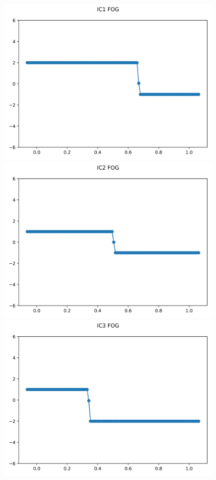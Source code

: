 \documentclass{article}
\begin{document}
\begin{figure}[t]
        \centering
        \includegraphics[width=.95\textwidth]{../../code/hires_IC1Methodfu_plot.png}
        \includegraphics[width=.95\textwidth]{../../code/hires_IC2Methodfu_plot.png}
        \includegraphics[width=.95\textwidth]{../../code/hires_IC3Methodfu_plot.png}

\end{figure}
\end{document}
